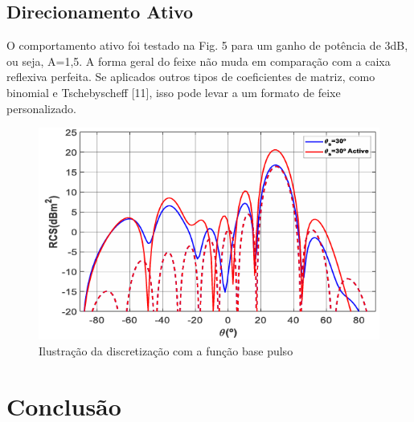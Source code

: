 \documentclass[
	12pt,				%
	openright,			%
	oneside,			%
	a4paper,			%
	english,			%
	brazil				%
	]{abntex2}
\begin{document}
\section{Direcionamento Ativo}
O comportamento ativo foi testado na Fig. 5 para um ganho de potência de 3dB, ou seja, A=1,5. A forma geral do feixe não muda em comparação com a caixa reflexiva perfeita. Se aplicados outros tipos de coeficientes de matriz, como binomial e Tschebyscheff [11], isso pode levar a um formato de feixe personalizado.
\begin{figure}[htb]
 \label{RCS10Active}
    \centering
    \caption{Ilustração da discretização  com a função base pulso} \label{fig_minipage}
    \includegraphics[width=\textwidth]{figures/ActiveRCS10.png}
  \hfill
\end{figure}
\chapter{Conclusão}

\lipsum[31-33]

\postextual


\end{document}
